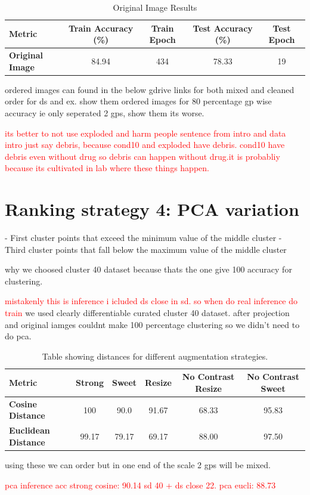 \begin{table}[h!]
  \centering
  \caption{Original Image Results}
  \label{tab:original_image_results}
  \begin{tabular}{lcccc}
  \toprule
  \textbf{Metric}         & \textbf{Train Accuracy (\%)} & \textbf{Train Epoch} & \textbf{Test Accuracy (\%)} & \textbf{Test Epoch} \\ \midrule
  \textbf{Original Image} & 84.94                        & 434                   & 78.33                        & 19                  \\ 
  \bottomrule
  \end{tabular}
\end{table}


ordered images can found in the below gdrive links for both mixed and cleaned order for ds and ex.
show them ordered images for 80 percentage gp wise accuracy ie only seperated 2 gps, show them its worse.

\textcolor{red}{its better to not use exploded and harm people sentence from intro and data intro just say debris, because cond10 and exploded have debris. cond10 
have debris even without drug so debris can happen without drug.it is probabliy because its cultivated in lab where these things happen.} 

\section{ Ranking strategy 4: PCA variation}

- First cluster points that exceed the minimum value of the middle cluster
- Third cluster points that fall below the maximum value of the middle cluster

why we choosed cluster 40 dataset because thats the one give 100 accuracy for clustering.

\textcolor{red}{mistakenly this is inference i  icluded ds close in sd. so when do real inference do train}
we used clearly differentiable curated cluster 40 dataset. after projection and original iamges couldnt make 100 percentage clustering so we didn't need to do pca.
\begin{table}[H]
    \centering
    \begin{tabular}{@{}lccccc@{}}
    \toprule
    \textbf{Metric}          & \textbf{Strong} & \textbf{Sweet} & \textbf{Resize} & \textbf{No Contrast Resize} & \textbf{No Contrast Sweet} \\ \midrule
    \textbf{Cosine Distance} & 100               & 90.0              & 91.67               & 68.33                           & 95.83                          \\
    \textbf{Euclidean Distance} & 99.17           & 79.17              & 69.17               & 88.00                           & 97.50                          \\ \bottomrule
    \end{tabular}
    \caption{Table showing distances for different augmentation strategies.}
    \label{tab:distances}
  \end{table}

using these we can order but in one end of the scale 2 gps will be mixed.


\textcolor{red}{pca inference acc strong cosine: 90.14 sd 40 + ds close 22. pca eucli: 88.73}


